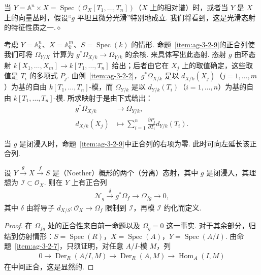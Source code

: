\begin{remark}\label{item:ag-3-2-10}
当 $Y=\mathbb A^n\times X=\operatorname{Spec}(\mathcal O_X[T_1,\ldots,T_n])$（$X$ 上的相对谱）时，或者当 $Y$ 是 $X$ 上的向量丛时，假设``$g$ 平坦且微分光滑''特别地成立. 我们将看到，这是光滑态射的特征性质之一.\unskip\nobreak\hfill\ensuremath{\diamond}
\renewcommand{\envenddiamond}{}
\end{remark}
\begin{example}\label{item:ag-3-2-11}
考虑 $Y=\mathbb A_k^n$、$X=\mathbb A_k^m$、$S=\operatorname{Spec}(k)$ 的情形. 命题~\ref{item:ag-3-2-9}的正合列使我们可将 $\Omega_{Y/X}$ 计算为 $g^*\Omega_{X/k}\longrightarrow\Omega_{Y/k}$ 的余核. 来具体写出此态射. 态射 $g$ 由环态射 $k[X_1,\ldots,X_m]\longrightarrow k[T_1,\ldots,T_n]$ 给出；后者由它在 $X_j$ 上的取值确定，这些取值是 $T_i$ 的多项式 $P_j$. 由例~\ref{item:ag-3-2-2}，$g^*\Omega_{X/k}$ 是以 $d_{X/k}(X_j)$（$j=1,\ldots,m$）为基的自由 $k[T_1,\ldots,T_n]$-模，而 $\Omega_{Y/k}$ 是以 $d_{Y/k}(T_i)$（$i=1,\ldots,n$）为基的自由 $k[T_1,\ldots,T_n]$-模. 所求映射于是由下式给出：
\begin{align*}
g^*\Omega_{X/k}&\longrightarrow\Omega_{Y/k},\\
d_{X/k}(X_j)&\longmapsto\sum_{i=1}^n\frac{\partial P_j}{\partial T_i}d_{Y/k}(T_i).
\tag*{$\diamond$}
\end{align*}
\renewcommand{\envenddiamond}{}
\end{example}
当 $g$ 是闭浸入时，命题~\ref{item:ag-3-2-9}中正合列的右项为零. 此时可向左延长该正合列.
\begin{proposition}\label{item:ag-3-2-12}
设 $Y\xrightarrow gX\xrightarrow fS$ 是（Noether）概形的两个（分离）态射，其中 $g$ 是闭浸入，其理想为 $\mathcal I\subset\mathcal O_X$. 则在 $Y$ 上有正合列
\begin{align*}
\mathcal N_g\xrightarrow\delta g^*\Omega_f\longrightarrow\Omega_{fg}\longrightarrow0,
\end{align*}
其中 $\delta$ 由将导子 $d_{X/S}:\mathcal O_X\longrightarrow\Omega_f$ 限制到 $\mathcal I$，再模 $\mathcal I$ 约化而定义.
\end{proposition}
\begin{proof}
在 $\Omega_{fg}$ 处的正合性来自前一命题以及 $\Omega_g=0$ 这一事实. 对于其余部分，归结到仿射情形：$S=\operatorname{Spec}(R)$，$X=\operatorname{Spec}(A)$，$Y=\operatorname{Spec}(A/I)$. 由命题~\ref{item:ag-3-2-7}，只须证明，对任意 $A/I$-模 $M$，列
\begin{align*}
0\longrightarrow\operatorname{Der}_R(A/I,M)\longrightarrow\operatorname{Der}_R(A,M)\longrightarrow\operatorname{Hom}_A(I,M)
\end{align*}
在中间正合，这是显然的.
\end{proof}
